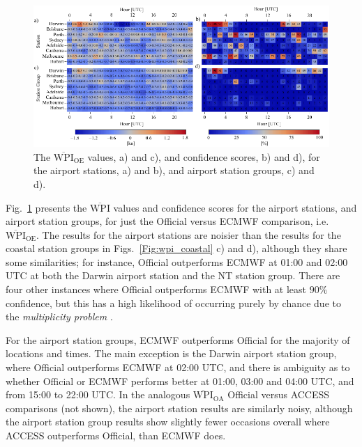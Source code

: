 \documentclass[twocol]{ametsoc}
\begin{document}
\begin{figure}
\centering
\includegraphics[width=39pc]{airport_wpi.pdf}
\caption{The $\overline{\text{WPI}}_\text{OE}$ values, a) and c), and confidence scores, b) and d), for the airport stations, a) and b), and airport station groups, c) and d).}
\label{Fig:airport_wpi}
\end{figure}

Fig.~\ref{Fig:airport_wpi} presents the $\overline{\text{WPI}}$ values and confidence scores for the airport stations, and airport station groups, for just the Official versus ECMWF comparison, i.e.~$\overline{\text{WPI}}_\text{OE}$. The results for the airport stations are noisier than the results for the coastal station groups in Figs.~\ref{Fig:wpi_coastal} c) and d), although they share some similarities; for instance, Official outperforms ECMWF at 01:00 and 02:00 UTC at both the Darwin airport station and the NT station group. There are four other instances where Official outperforms ECMWF with at least $90\%$ confidence, but this has a high likelihood of occurring purely by chance due to the \textit{multiplicity problem} \citep[p. 178]{wilks11}.

For the airport station groups, ECMWF outperforms Official for the majority of locations and times. The main exception is the Darwin airport station group, where Official outperforms ECMWF at 02:00 UTC, and there is ambiguity as to whether Official or ECMWF performs better at 01:00, 03:00 and 04:00 UTC, and from 15:00 to 22:00 UTC. In the analogous $\overline{\text{WPI}}_\text{OA}$ Official versus ACCESS comparisons (not shown), the airport station results are similarly noisy, although the airport station group results show slightly fewer occasions overall where ACCESS outperforms Official, than ECMWF does. 
\end{document}

